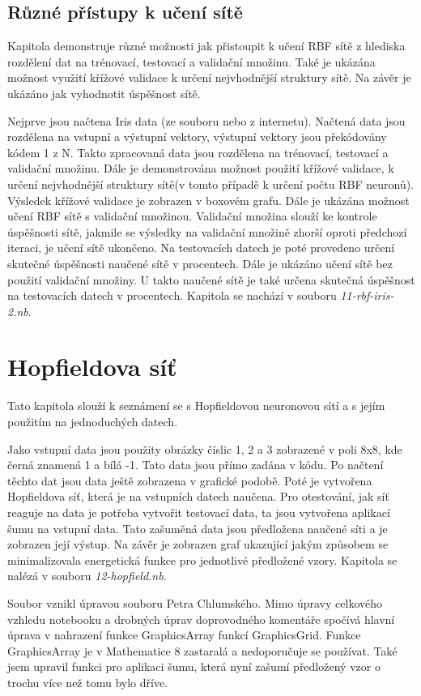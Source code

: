 \documentclass[11pt,twoside,a4paper]{book}
\begin{document}
\subsection{Různé přístupy k učení sítě}
Kapitola demonstruje různé možnosti jak přistoupit k učení RBF sítě z hlediska rozdělení dat na trénovací, testovací a validační množinu. Také je ukázána možnost využití křížové validace k určení nejvhodnější struktury sítě. Na závěr je ukázáno jak vyhodnotit úspěšnost sítě.

Nejprve jsou načtena Iris data (ze souboru nebo z internetu). Načtená data jsou rozdělena na vstupní a výstupní vektory, výstupní vektory jsou překódovány kódem 1 z N. Takto zpracovaná data jsou rozdělena na trénovací, testovací a validační množinu. Dále je demonstrována možnost použití křížové validace, k určení nejvhodnější struktury sítě(v tomto případě k určení počtu RBF neuronů). Výsledek křížové validace je zobrazen v boxovém grafu. Dále je ukázána možnost učení RBF sítě s validační množinou. Validační množina slouží ke kontrole úspěšnosti sítě, jakmile se výsledky na validační množině zhorší oproti předchozí iteraci, je učení sítě ukončeno. Na testovacích datech je poté provedeno určení skutečné úspěšnosti naučené sítě v procentech. Dále je ukázáno učení sítě bez použití validační množiny. U takto naučené sítě je také určena skutečná úspěšnost na testovacích datech v procentech. Kapitola se nachází v souboru \textit{11-rbf-iris-2.nb}.
\section{Hopfieldova síť}
Tato kapitola slouží k seznámení se s Hopfieldovou neuronovou sítí a s jejím použitím na jednoduchých datech.

Jako vstupní data jsou použity obrázky číslic 1, 2 a 3 zobrazené v poli 8x8, kde černá znamená 1 a bílá -1. Tato data jsou přímo zadána v kódu. Po načtení těchto dat jsou data ještě zobrazena v grafické podobě. Poté je vytvořena Hopfieldova síť, která je na vstupních datech naučena. Pro otestování, jak síť reaguje na data je potřeba vytvořit testovací data, ta jsou vytvořena aplikací šumu na vstupní data. Tato zašuměná data jsou předložena naučené síti a je zobrazen její výstup. Na závěr je zobrazen graf ukazující jakým způsobem se minimalizovala energetická funkce pro jednotlivé předložené vzory. Kapitola se nalézá v souboru \textit{12-hopfield.nb}.

Soubor vznikl úpravou souboru Petra Chlumského. Mimo úpravy celkového vzhledu notebooku a drobných úprav doprovodného komentáře spočívá hlavní úprava v nahrazení funkce GraphicsArray funkcí GraphicsGrid. Funkce GraphicsArray je v Mathematice 8 zastaralá a nedoporučuje se používat. Také jsem upravil funkci pro aplikaci šumu, která nyní zašumí předložený vzor o trochu více než tomu bylo dříve.
\end{document}
